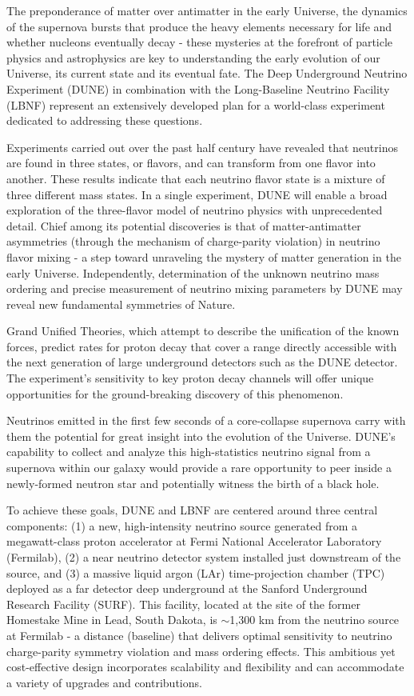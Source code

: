 



The preponderance of matter over antimatter in the early Universe, the dynamics of the supernova bursts that produce the heavy elements necessary for life and whether nucleons eventually decay - these mysteries at the forefront of particle physics and astrophysics are key to understanding the early evolution of our Universe, its current state and its eventual fate. The Deep Underground Neutrino Experiment (DUNE)
in combination with the Long-Baseline Neutrino Facility (LBNF) represent an extensively developed plan for a world-class experiment dedicated to addressing these questions.

Experiments carried out over the past half century have revealed that neutrinos are found in three states, or flavors, and can transform from one flavor into another. These results indicate that each neutrino flavor state is a mixture of three different mass states. In a single experiment, DUNE will enable a broad exploration of the three-flavor model of neutrino physics with unprecedented detail. Chief among its potential discoveries is that of matter-antimatter asymmetries (through the mechanism of charge-parity violation) in neutrino flavor mixing - a step toward unraveling the mystery of matter generation in the early Universe. Independently, determination of the unknown neutrino mass ordering and precise measurement of neutrino mixing parameters by DUNE may reveal new fundamental symmetries of Nature.

Grand Unified Theories, which attempt to describe the unification of the known forces, predict rates for proton decay that cover a range directly accessible with the next generation of large underground detectors such as the DUNE detector. The experiment's sensitivity to key proton decay channels will offer unique opportunities for the ground-breaking discovery of this phenomenon.

Neutrinos emitted in the first few seconds of a core-collapse supernova carry with them the potential for great insight into the evolution of the Universe. DUNE's capability to collect and analyze this high-statistics neutrino signal from a supernova within our galaxy would provide a rare opportunity to peer inside a newly-formed neutron star and potentially witness the birth of a black hole.

To achieve these goals, DUNE and LBNF are centered around three central components: (1) a new, high-intensity neutrino source generated from a megawatt-class proton accelerator at Fermi National Accelerator Laboratory (Fermilab), (2) a near neutrino detector system installed just downstream of the source, and (3) a massive liquid argon (LAr) time-projection chamber (TPC) deployed as a far detector deep underground at the Sanford Underground Research Facility (SURF). This facility, located at the site of the former Homestake Mine in Lead, South Dakota, is $\sim$1,300 km from the neutrino source at Fermilab - a distance (baseline) that delivers optimal sensitivity to neutrino charge-parity symmetry violation and mass ordering effects. This ambitious yet cost-effective design incorporates scalability and flexibility and can accommodate a variety of upgrades and contributions.

